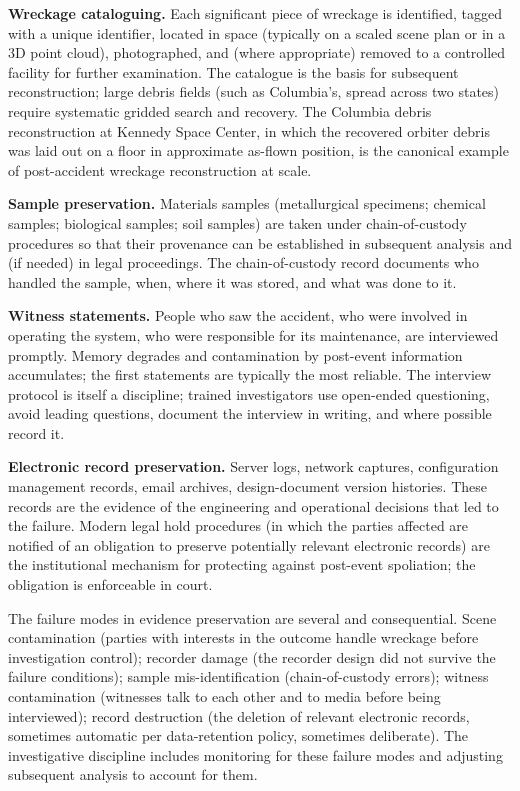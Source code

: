\textbf{Wreckage cataloguing.} Each significant piece of wreckage is identified, tagged with a unique identifier, located in space (typically on a scaled scene plan or in a 3D point cloud), photographed, and (where appropriate) removed to a controlled facility for further examination. The catalogue is the basis for subsequent reconstruction; large debris fields (such as Columbia's, spread across two states) require systematic gridded search and recovery. The Columbia debris reconstruction at Kennedy Space Center, in which the recovered orbiter debris was laid out on a floor in approximate as-flown position, is the canonical example of post-accident wreckage reconstruction at scale.

\textbf{Sample preservation.} Materials samples (metallurgical specimens; chemical samples; biological samples; soil samples) are taken under chain-of-custody procedures so that their provenance can be established in subsequent analysis and (if needed) in legal proceedings. The chain-of-custody record documents who handled the sample, when, where it was stored, and what was done to it.

\textbf{Witness statements.} People who saw the accident, who were involved in operating the system, who were responsible for its maintenance, are interviewed promptly. Memory degrades and contamination by post-event information accumulates; the first statements are typically the most reliable. The interview protocol is itself a discipline; trained investigators use open-ended questioning, avoid leading questions, document the interview in writing, and where possible record it.

\textbf{Electronic record preservation.} Server logs, network captures, configuration management records, email archives, design-document version histories. These records are the evidence of the engineering and operational decisions that led to the failure. Modern legal hold procedures (in which the parties affected are notified of an obligation to preserve potentially relevant electronic records) are the institutional mechanism for protecting against post-event spoliation; the obligation is enforceable in court.

The failure modes in evidence preservation are several and consequential. Scene contamination (parties with interests in the outcome handle wreckage before investigation control); recorder damage (the recorder design did not survive the failure conditions); sample mis-identification (chain-of-custody errors); witness contamination (witnesses talk to each other and to media before being interviewed); record destruction (the deletion of relevant electronic records, sometimes automatic per data-retention policy, sometimes deliberate). The investigative discipline includes monitoring for these failure modes and adjusting subsequent analysis to account for them.

